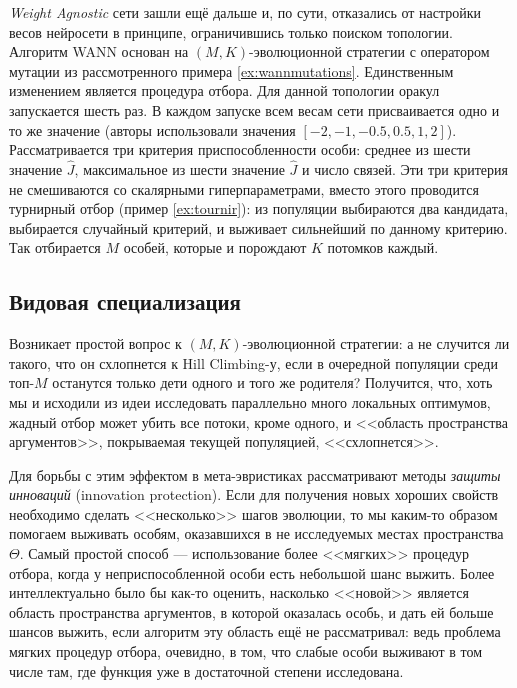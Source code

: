 \emph{Weight Agnostic} сети зашли ещё дальше и, по сути, отказались от настройки весов нейросети в принципе, ограничившись только поиском топологии. Алгоритм WANN основан на $(M, K)$-эволюционной стратегии с оператором мутации из рассмотренного примера \ref{ex:wannmutations}. Единственным изменением является процедура отбора. Для данной топологии оракул запускается шесть раз. В каждом запуске всем весам сети присваивается одно и то же значение (авторы использовали значения $[-2, -1, -0.5, 0.5, 1, 2]$). Рассматривается три критерия приспособленности особи: среднее из шести значение $\hat{J}$, максимальное из шести значение $\hat{J}$ и число связей. Эти три критерия не смешиваются со скалярными гиперпараметрами, вместо этого проводится турнирный отбор (пример \ref{ex:tournir}): из популяции выбираются два кандидата, выбирается случайный критерий, и выживает сильнейший по данному критерию. Так отбирается $M$ особей, которые и порождают $K$ потомков каждый.

\subsection{Видовая специализация}\label{specieisidea}

Возникает простой вопрос к $(M, K)$-эволюционной стратегии: а не случится ли такого, что он схлопнется к Hill Climbing-у, если в очередной популяции среди топ-$M$ останутся только дети одного и того же родителя? Получится, что, хоть мы и исходили из идеи исследовать параллельно много локальных оптимумов, жадный отбор может убить все потоки, кроме одного, и <<область пространства аргументов>>, покрываемая текущей популяцией, <<схлопнется>>.

Для борьбы с этим эффектом в мета-эвристиках рассматривают методы \emph{защиты инноваций} (innovation protection). Если для получения новых хороших свойств необходимо сделать <<несколько>> шагов эволюции, то мы каким-то образом помогаем выживать особям, оказавшихся в не исследуемых местах пространства $\Theta$. Самый простой способ --- использование более <<мягких>> процедур отбора, когда у неприспособленной особи есть небольшой шанс выжить. Более интеллектуально было бы как-то оценить, насколько <<новой>> является область пространства аргументов, в которой оказалась особь, и дать ей больше шансов выжить, если алгоритм эту область ещё не рассматривал: ведь проблема мягких процедур отбора, очевидно, в том, что слабые особи выживают в том числе там, где функция уже в достаточной степени исследована.

